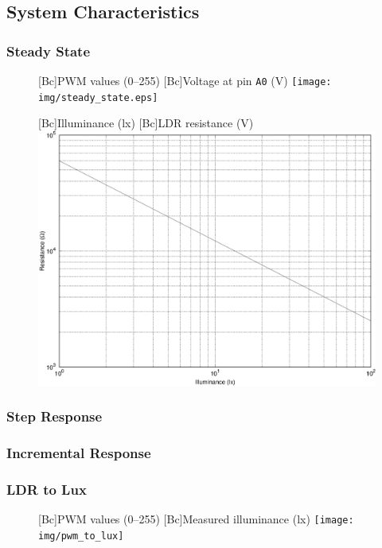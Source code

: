 \subsection{System Characteristics}
\label{sec:SystemCharacteristics}

\subsubsection{Steady State}
\label{sub:SteadyState}

\begin{figure}[h]
    \centering
    [Bc]{PWM values (0--255)}
    [Bc]{Voltage at pin \texttt{A0} (\si{\volt})}
    \texttt{[image: img/steady\_state.eps]}
    \caption{}
    \label{fig:}
\end{figure}

\begin{figure}[h]
    \centering
    [Bc]{Illuminance (\si{\lux})}
    [Bc]{LDR resistance (\si{\volt})}
    \includegraphics[width=.9\textwidth]{img/LDR_model}
    \caption{}
    \label{fig:}
\end{figure}

\subsubsection{Step Response}
\label{sub:StepResponse}

\subsubsection{Incremental Response}
\label{sub:IncrementalResponse}

\subsubsection{LDR to Lux}
\label{sub:LDRtoLux}

\begin{figure}[h]
    \centering
    [Bc]{PWM values (0--255)}
    [Bc]{Measured illuminance (\si{\lux})}
    \texttt{[image: img/pwm\_to\_lux]}
    \caption{}
    \label{fig:}
\end{figure}

